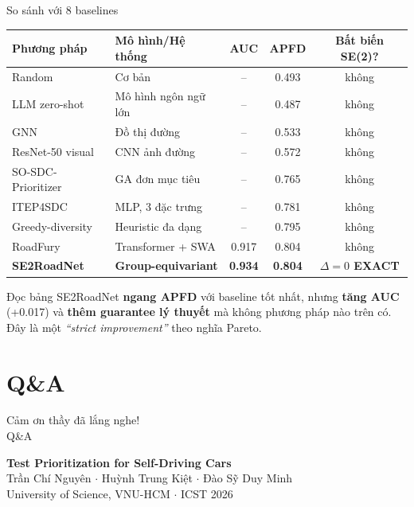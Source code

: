 \documentclass[aspectratio=169,10pt]{beamer}
\begin{document}
\begin{frame}{So sánh với 8 baselines}
\small
\begin{center}
\begin{tabular}{l l c c c}
\toprule
\textbf{Phương pháp} & \textbf{Mô hình/Hệ thống} & \textbf{AUC} & \textbf{APFD} & \textbf{Bất biến SE(2)?} \\
\midrule
Random              & Cơ bản                 & --     & 0.493 & không \\
LLM zero-shot       & Mô hình ngôn ngữ lớn   & --     & 0.487 & không \\
GNN                 & Đồ thị đường           & --     & 0.533 & không \\
ResNet-50 visual    & CNN ảnh đường          & --     & 0.572 & không \\
SO-SDC-Prioritizer  & GA đơn mục tiêu        & --     & 0.765 & không \\
ITEP4SDC            & MLP, 3 đặc trưng       & --     & 0.781 & không \\
Greedy-diversity    & Heuristic đa dạng      & --     & 0.795 & không \\
RoadFury            & Transformer + SWA      & 0.917  & 0.804 & không \\
\midrule
\rowcolor{success!15}
\textbf{SE2RoadNet} & \textbf{Group-equivariant} & \textbf{0.934} & \textbf{0.804}
        & \cellcolor{success!25}\textbf{$\Delta = 0$ EXACT} \\
\bottomrule
\end{tabular}
\end{center}

\vspace{0.6em}
\begin{exampleblock}{Đọc bảng}
\small
SE2RoadNet \textbf{ngang APFD} với baseline tốt nhất, nhưng \textbf{tăng AUC} (+0.017) và \textbf{thêm guarantee lý thuyết} mà không phương pháp nào trên có. Đây là một \emph{``strict improvement''} theo nghĩa Pareto.
\end{exampleblock}
\end{frame}

\section{Q\&A}

\begin{frame}
\centering
\vspace{0.8em}
{\Huge Cảm ơn thầy đã lắng nghe!}\\[0.7em]
{\Large \textcolor{accent}{Q\&A}}

\vspace{1.6em}
{\normalsize \textbf{Test Prioritization for Self-Driving Cars}}\\[0.3em]
{\scriptsize Trần Chí Nguyên \quad $\cdot$ \quad Huỳnh Trung Kiệt \quad $\cdot$ \quad Đào Sỹ Duy Minh}\\[0.2em]
{\scriptsize University of Science, VNU-HCM \quad $\cdot$ \quad ICST 2026}
\end{frame}
\end{document}
